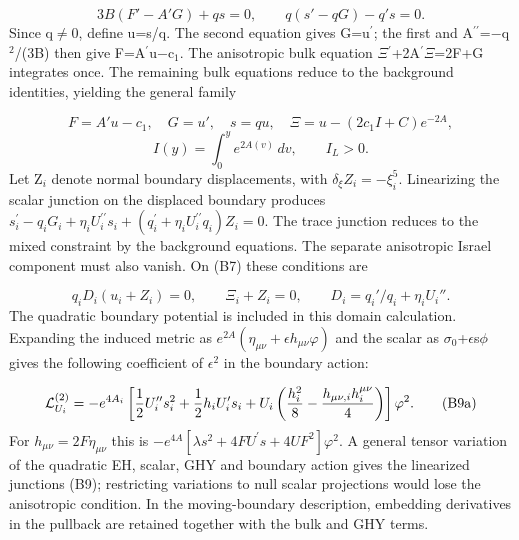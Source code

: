 \documentclass[11pt,a4paper]{article}
\begin{document}
\begin{equation}
3B(F'-A'G)+qs=0,\qquad q(s'-qG)-q's=0.\tag{B6}
\end{equation}
Since q\ensuremath{\ne}0, define u=s/q. The second equation gives G=u\ensuremath{{}^{\prime}}; the first and A\ensuremath{{}^{\prime\prime}}=\ensuremath{-}q\ensuremath{{}^{2}}/(3B) then give F=A\ensuremath{{}^{\prime}}u\ensuremath{-}c\ensuremath{{}_{1}}. The anisotropic bulk equation \ensuremath{\Xi}\ensuremath{{}^{\prime}}+2A\ensuremath{{}^{\prime}}\ensuremath{\Xi}=2F+G integrates once. The remaining bulk equations reduce to the background identities, yielding the general family

\begin{equation}
F=A'u-c_1,\quad G=u',\quad s=qu,\quad \Xi=u-(2c_1I+C)e^{-2A},\tag{B7}
\end{equation}
\begin{equation}
I(y)=\int_0^y e^{2A(v)}\,dv,\qquad I_L>0.\tag{B8}
\end{equation}
Let Z\ensuremath{{}_{i}} denote normal boundary displacements, with \ensuremath{\delta_\xi Z_i=-\xi_i^5}. Linearizing the scalar junction on the displaced boundary produces \ensuremath{s_i^{\prime}-q_iG_i+\eta_iU_i^{\prime\prime}s_i+(q_i^{\prime}+\eta_iU_i^{\prime\prime}q_i)Z_i=0}. The trace junction reduces to the mixed constraint by the background equations. The separate anisotropic Israel component must also vanish. On (B7) these conditions are

\begin{equation}
q_iD_i(u_i+Z_i)=0,\qquad\Xi_i+Z_i=0,\qquad D_i=q_i'/q_i+\eta_iU_i''.\tag{B9}
\end{equation}
The quadratic boundary potential is included in this domain calculation. Expanding the induced metric as \ensuremath{e^{2A}(\eta_{\mu\nu}+\epsilon h_{\mu\nu}\varphi)} and the scalar as \ensuremath{\sigma}\ensuremath{{}_{0}}+\ensuremath{\epsilon}s\ensuremath{\phi} gives the following coefficient of \ensuremath{\epsilon}\ensuremath{{}^{2}} in the boundary action:

\begin{equation}
{\cal L}_{U_i}^{(2)}=-e^{4A_i}\left[\frac12U_i''s_i^2+\frac12h_iU_i's_i+U_i\left(\frac{h_i^2}{8}-\frac{h_{\mu\nu,i}h_i^{\mu\nu}}4\right)\right]\varphi^2.\tag{B9a}
\end{equation}
For \ensuremath{h_{\mu\nu}=2F\eta_{\mu\nu}} this is \ensuremath{-e^{4A}[\lambda s^2+4FU^{\prime}s+4UF^2]\varphi^2}. A general tensor variation of the quadratic EH, scalar, GHY and boundary action gives the linearized junctions (B9); restricting variations to null scalar projections would lose the anisotropic condition. In the moving-boundary description, embedding derivatives in the pullback are retained together with the bulk and GHY terms.
\end{document}
